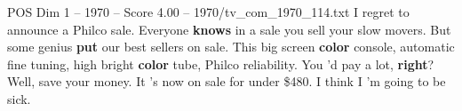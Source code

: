 \begin{textsample}{POS Dim 1 – 1970 – Score 4.00 – 1970/tv\_com\_1970\_114.txt}  \label{ex:f1_pos_039}
I regret to announce a Philco sale.
Everyone \textbf{knows} in a sale you sell your slow movers.
But some genius \textbf{put} our best sellers on sale.
This big screen \textbf{color} console, automatic fine tuning, high bright \textbf{color} tube, Philco reliability.
You 'd pay a lot, \textbf{right}?
Well, save your money.
It 's now on sale for under \$480.
I think I 'm going to be sick.

\end{textsample}
